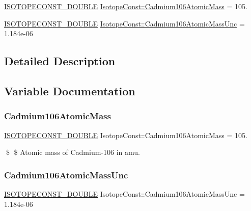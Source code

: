 \begin{DoxyCompactItemize}
\item 
\mbox{\hyperlink{group___isotope_const-_macros_ga8f45a7272ce02c0b4c65c44636ed719a}{I\+S\+O\+T\+O\+P\+E\+C\+O\+N\+S\+T\+\_\+\+D\+O\+U\+B\+LE}} \mbox{\hyperlink{group___isotope_const-_cadmium-_cd106_ga45ef7b57bdd7e234a1d1096d54b21047}{Isotope\+Const\+::\+Cadmium106\+Atomic\+Mass}} = 105.
\item 
\mbox{\hyperlink{group___isotope_const-_macros_ga8f45a7272ce02c0b4c65c44636ed719a}{I\+S\+O\+T\+O\+P\+E\+C\+O\+N\+S\+T\+\_\+\+D\+O\+U\+B\+LE}} \mbox{\hyperlink{group___isotope_const-_cadmium-_cd106_ga857bd5b9c4663313a5b31b43e3a1ee8f}{Isotope\+Const\+::\+Cadmium106\+Atomic\+Mass\+Unc}} = 1.\+184e-\/06
\end{DoxyCompactItemize}


\subsection{Detailed Description}


\subsection{Variable Documentation}
\mbox{\label{group___isotope_const-_cadmium-_cd106_ga45ef7b57bdd7e234a1d1096d54b21047}} 
\subsubsection{\texorpdfstring{Cadmium106\+Atomic\+Mass}{Cadmium106AtomicMass}}
{\footnotesize\ttfamily \mbox{\hyperlink{group___isotope_const-_macros_ga8f45a7272ce02c0b4c65c44636ed719a}{I\+S\+O\+T\+O\+P\+E\+C\+O\+N\+S\+T\+\_\+\+D\+O\+U\+B\+LE}} Isotope\+Const\+::\+Cadmium106\+Atomic\+Mass = 105.}

\$ \$ Atomic mass of Cadmium-\/106 in amu. \mbox{\label{group___isotope_const-_cadmium-_cd106_ga857bd5b9c4663313a5b31b43e3a1ee8f}} 
\subsubsection{\texorpdfstring{Cadmium106\+Atomic\+Mass\+Unc}{Cadmium106AtomicMassUnc}}
{\footnotesize\ttfamily \mbox{\hyperlink{group___isotope_const-_macros_ga8f45a7272ce02c0b4c65c44636ed719a}{I\+S\+O\+T\+O\+P\+E\+C\+O\+N\+S\+T\+\_\+\+D\+O\+U\+B\+LE}} Isotope\+Const\+::\+Cadmium106\+Atomic\+Mass\+Unc = 1.\+184e-\/06}

